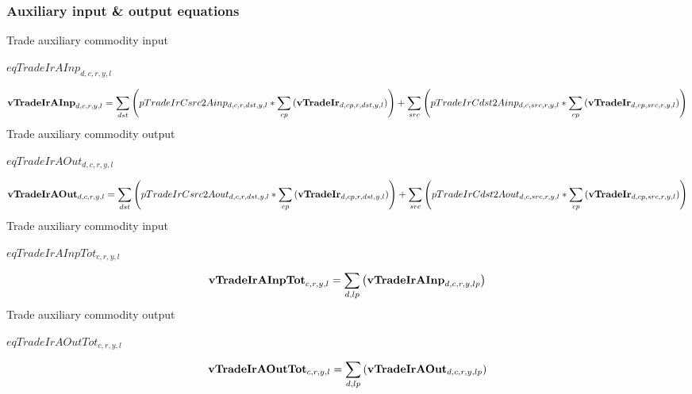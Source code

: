 \documentclass{article}
\begin{document}
\subsubsection*{Auxiliary input \& output equations}
Trade auxiliary commodity input







$eqTradeIrAInp_{d,c,r,y,l}$





\begin{dmath} 
{\bf vTradeIrAInp}_{d,c,r,y,l}  =  \sum_{dst}{\left(pTradeIrCsrc2Ainp_{d,c,r,dst,y,l}*\sum_{cp}{\left({\bf vTradeIr}_{d,cp,r,dst,y,l}\right)}\right)}+\sum_{src}{\left(pTradeIrCdst2Ainp_{d,c,src,r,y,l}*\sum_{cp}{\left({\bf vTradeIr}_{d,cp,src,r,y,l}\right)}\right)}
\end{dmath} 
Trade auxiliary commodity output







$eqTradeIrAOut_{d,c,r,y,l}$





\begin{dmath} 
{\bf vTradeIrAOut}_{d,c,r,y,l}  =  \sum_{dst}{\left(pTradeIrCsrc2Aout_{d,c,r,dst,y,l}*\sum_{cp}{\left({\bf vTradeIr}_{d,cp,r,dst,y,l}\right)}\right)}+\sum_{src}{\left(pTradeIrCdst2Aout_{d,c,src,r,y,l}*\sum_{cp}{\left({\bf vTradeIr}_{d,cp,src,r,y,l}\right)}\right)}
\end{dmath} 
Trade auxiliary commodity input







$eqTradeIrAInpTot_{c,r,y,l}$





\begin{dmath} 
{\bf vTradeIrAInpTot}_{c,r,y,l}  =  \sum_{d,lp}{\left({\bf vTradeIrAInp}_{d,c,r,y,lp}\right)}
\end{dmath} 
Trade auxiliary commodity output







$eqTradeIrAOutTot_{c,r,y,l}$





\begin{dmath} 
{\bf vTradeIrAOutTot}_{c,r,y,l}  =  \sum_{d,lp}{\left({\bf vTradeIrAOut}_{d,c,r,y,lp}\right)}
\end{dmath} 
\end{document}
